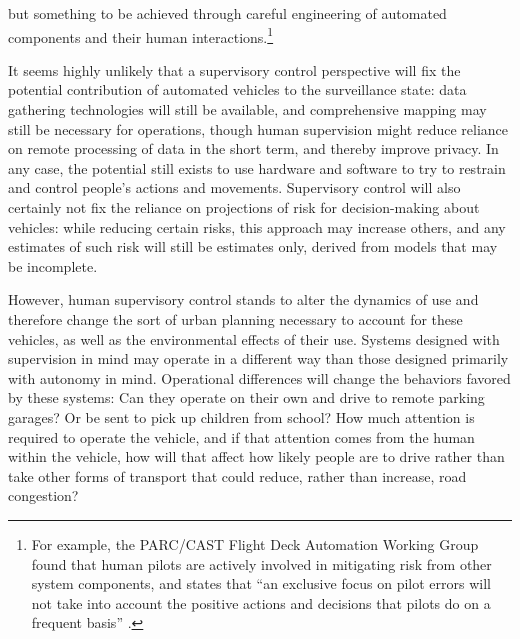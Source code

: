 but something to be  
achieved through careful engineering of automated components and their
human interactions.\footnote{For example, the PARC/CAST Flight Deck Automation Working Group
found that human pilots are actively involved in mitigating risk from
other system components, and states that ``an exclusive focus on pilot
errors will not take into account the positive actions and decisions
that pilots do on a frequent basis'' \cite[p. 30]{PARCCAST}.}

It seems highly unlikely that a supervisory control perspective will
fix the potential contribution of automated vehicles to the
surveillance state:  data gathering technologies will still be
available, and comprehensive mapping may still be necessary for
operations, though human supervision might reduce
reliance on remote processing of data in the short term, and thereby
improve privacy. In 
any case, the potential still exists to use hardware 
and software to try to restrain and control people's actions and
movements. Supervisory control will also certainly not fix the
reliance on projections of risk for decision-making about vehicles:
while reducing certain risks, this approach may increase others, and
any estimates of such risk will still be estimates only, derived from
models that may be incomplete.


However, human supervisory control stands to alter the dynamics of use
and therefore change the sort of urban planning necessary to account
for these vehicles, as well as the environmental effects of their use.
Systems designed with supervision in mind may operate in a different
way than those designed primarily with autonomy in mind. Operational
differences will change the behaviors favored by these systems:  Can
they operate on their own and drive to remote parking garages? Or be
sent to pick up children from school? How much attention is required
to operate the vehicle, and if that attention comes from the human
within the vehicle, how will that affect how likely people are to
drive rather than take other forms of transport that could reduce,
rather than increase, road congestion? 

